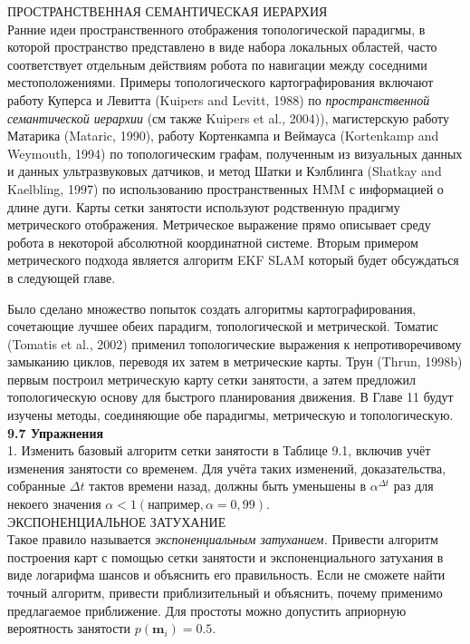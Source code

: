 \documentclass[10pt,a4paper]{article}
\begin{document}
ПРОСТРАНСТВЕННАЯ СЕМАНТИЧЕСКАЯ
ИЕРАРХИЯ\\
Ранние идеи пространственного отображения топологической парадигмы, в которой пространство представлено в виде набора локальных областей, часто соответствует отдельным действиям робота по навигации между соседними местоположениями. Примеры топологического картографирования включают работу Куперса и Левитта (Kuipers and Levitt, 1988) по \textit{пространственной семантической иерархии }(см также Kuipers et al., 2004)), магистерскую работу Матарика  (Mataric, 1990), работу Кортенкампа и Веймауса (Kortenkamp and Weymouth, 1994) по топологическим графам, полученным из визуальных данных и данных ультразвуковых датчиков, и метод Шатки и Кэлблинга (Shatkay and Kaelbling, 1997) по использованию пространственных HMM с информацией о длине дуги. Карты сетки занятости используют родственную прадигму метрического отображения. Метрическое выражение прямо описывает среду робота в некоторой абсолютной координатной системе. Вторым примером метрического подхода является алгоритм EKF SLAM который будет обсуждаться в следующей главе.

Было сделано множество попыток создать алгоритмы картографирования, сочетающие лучшее обеих парадигм, топологической и метрической. Томатис (Tomatis et al., 2002) применил топологические выражения к непротиворечивому замыканию циклов, переводя их затем в метрические карты. Трун (Thrun, 1998b) первым построил метрическую карту сетки занятости, а затем предложил топологическую основу для быстрого планирования движения. В Главе 11 будут изучены методы, соединяющие обе парадигмы, метрическую и топологическую.\\

\textbf{9.7	Упражнения}\\

1.	Изменить базовый алгоритм сетки занятости в Таблице 9.1, включив учёт изменения занятости со временем. Для учёта таких изменений, доказательства, собранные $\varDelta t$ тактов времени назад, должны быть уменьшены в $\alpha^{\varDelta t}$ раз для некоего значения $\alpha<1(\text{например}, \alpha=0,99)$.\\
ЭКСПОНЕНЦИАЛЬНОЕ ЗАТУХАНИЕ \\
Такое правило называется \textit{экспоненциальным затуханием.} Привести алгоритм построения карт с помощью сетки занятости и экспоненциального затухания в виде логарифма шансов и объяснить его правильность. Если не сможете найти точный алгоритм, привести приблизительный и объяснить, почему применимо предлагаемое приближение. Для простоты можно допустить априорную вероятность занятости $p(\textbf{m}_i) = 0.5$.\\
\end{document}
